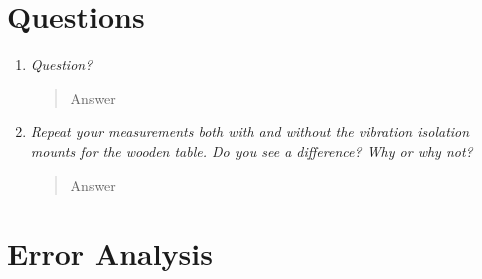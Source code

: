 \documentclass{amsart}
\begin{document}
\section{Questions}

\begin{enumerate}
\item {\textit{Question?}
\begin{quote}
Answer
\end{quote}}

\item{\textit{Repeat your measurements both with and without the vibration isolation mounts for the wooden table. Do you see a difference? Why or why not?}
\begin{quote}
Answer
\end{quote}}

\end{enumerate}

\section{Error Analysis}
\end{document}
